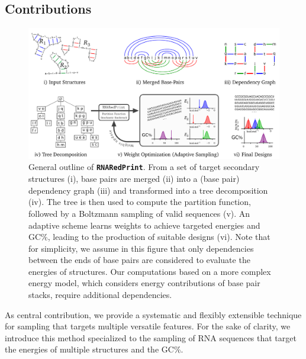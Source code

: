 \documentclass[]{bmcart}
\newcommand{\Nuc}[1]{{\sf #1}}
\newcommand{\Cb}{\Nuc{C}}
\newcommand{\Gb}{\Nuc{G}}
\newcommand{\GCb}{\Gb\Cb}
\newcommand{\ourprog}{{\tt \bfseries{}\color{black!85}RNA\textcolor{red!70!black}{Red}Print}}
\newcommand{\revised}[1]{{\color{red} #1}}
\begin{document}
\subsection*{Contributions}

\begin{figure}[t]
\begin{center}
    \includegraphics[width=.8\textwidth]{Figs/Workflow}
\end{center}
\caption{General outline of \ourprog{}. From a set of target secondary structures (i), base pairs are merged (ii) into a (base pair) dependency graph (iii) and transformed into a tree decomposition (iv). The tree is then used to compute the partition function, followed by a Boltzmann sampling of valid sequences (v). An adaptive scheme learns weights to achieve targeted energies and \GCb\%, leading to the production of suitable designs (vi). \revised{Note that for simplicity, we assume in this figure that only dependencies between the ends of base pairs are considered to evaluate the energies of structures. Our computations based on a more complex energy model, which considers energy contributions of base pair stacks, require additional dependencies.}
  }
\label{fig:workflow}
\end{figure}

\revised{As central contribution, we provide a systematic and flexibly extensible technique for sampling that targets multiple versatile features. For the sake of clarity, we introduce this method specialized to the sampling of RNA sequences that target the energies of multiple structures and the \GCb\%.}
\end{document}
